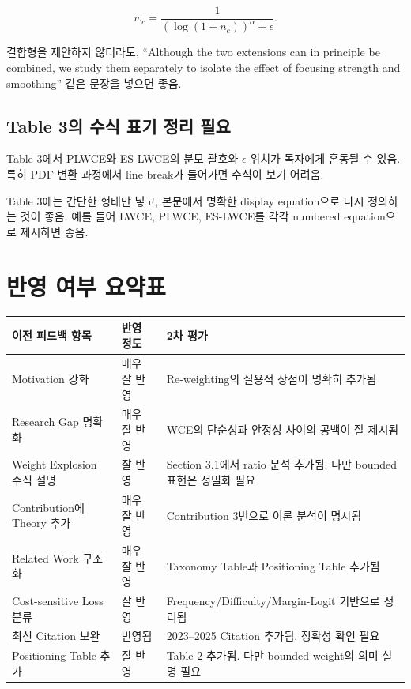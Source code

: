 \documentclass[11pt,a4paper]{article}
\begin{document}
\begin{equation}
w_c = \frac{1}{(\log(1+n_c))^\alpha + \epsilon}.
\end{equation}

\begin{tcolorbox}[title=수정 권장]
결합형을 제안하지 않더라도, ``Although the two extensions can in principle be combined, we study them separately to isolate the effect of focusing strength and smoothing'' 같은 문장을 넣으면 좋음.
\end{tcolorbox}

\subsection{Table 3의 수식 표기 정리 필요}

Table 3에서 PLWCE와 ES-LWCE의 분모 괄호와 \(\epsilon\) 위치가 독자에게 혼동될 수 있음. 특히 PDF 변환 과정에서 line break가 들어가면 수식이 보기 어려움.

\begin{tcolorbox}[title=수정 권장]
Table 3에는 간단한 형태만 넣고, 본문에서 명확한 display equation으로 다시 정의하는 것이 좋음. 예를 들어 LWCE, PLWCE, ES-LWCE를 각각 numbered equation으로 제시하면 좋음.
\end{tcolorbox}

\section{반영 여부 요약표}

\begin{center}
\begin{tabular}{p{}p{}p{}}
\toprule
이전 피드백 항목 & 반영 정도 & 2차 평가 \\
\midrule
Motivation 강화 & 매우 잘 반영 & Re-weighting의 실용적 장점이 명확히 추가됨 \\
Research Gap 명확화 & 매우 잘 반영 & WCE의 단순성과 안정성 사이의 공백이 잘 제시됨 \\
Weight Explosion 수식 설명 & 잘 반영 & Section 3.1에서 ratio 분석 추가됨. 다만 bounded 표현은 정밀화 필요 \\
Contribution에 Theory 추가 & 매우 잘 반영 & Contribution 3번으로 이론 분석이 명시됨 \\
Related Work 구조화 & 매우 잘 반영 & Taxonomy Table과 Positioning Table 추가됨 \\
Cost-sensitive Loss 분류 & 잘 반영 & Frequency/Difficulty/Margin-Logit 기반으로 정리됨 \\
최신 Citation 보완 & 반영됨 & 2023--2025 Citation 추가됨. 정확성 확인 필요 \\
Positioning Table 추가 & 잘 반영 & Table 2 추가됨. 다만 bounded weight의 의미 설명 필요 \\
\bottomrule
\end{tabular}
\end{center}
\end{document}
